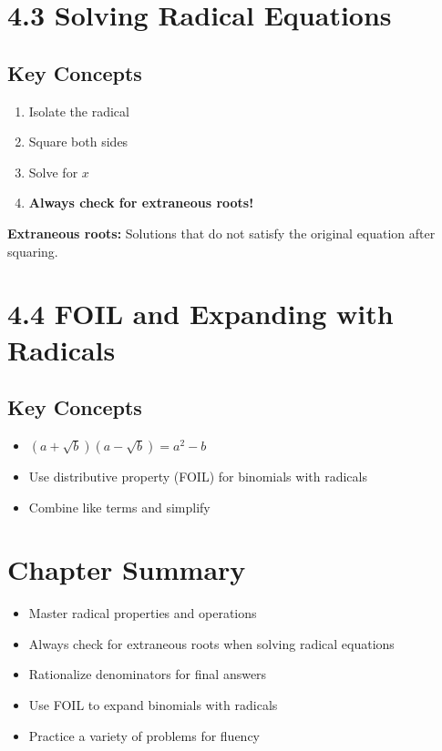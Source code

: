 \documentclass[12pt]{article}
\begin{document}
\section{4.3 Solving Radical Equations}
\subsection*{Key Concepts}
\begin{tcolorbox}[colback=lightgray,colframe=primary,title=Solving Radical Equations]
    \begin{enumerate}
        \item Isolate the radical
        \item Square both sides
        \item Solve for $x$
        \item \textbf{Always check for extraneous roots!}
    \end{enumerate}
    \vspace{0.5em}
    \textbf{Extraneous roots:} Solutions that do not satisfy the original equation after squaring.
\end{tcolorbox}

\section{4.4 FOIL and Expanding with Radicals}
\subsection*{Key Concepts}
\begin{tcolorbox}[colback=lightgray,colframe=primary,title=FOIL with Radicals]
    \begin{itemize}
        \item $(a+\sqrt{b})(a-\sqrt{b}) = a^2-b$
        \item Use distributive property (FOIL) for binomials with radicals
        \item Combine like terms and simplify
    \end{itemize}
\end{tcolorbox}

\section*{Chapter Summary}
\begin{tcolorbox}[colback=lightgray,colframe=primary,title=Key Takeaways]
    \begin{itemize}
        \item Master radical properties and operations
        \item Always check for extraneous roots when solving radical equations
        \item Rationalize denominators for final answers
        \item Use FOIL to expand binomials with radicals
        \item Practice a variety of problems for fluency
    \end{itemize}
\end{tcolorbox}
\end{document}
